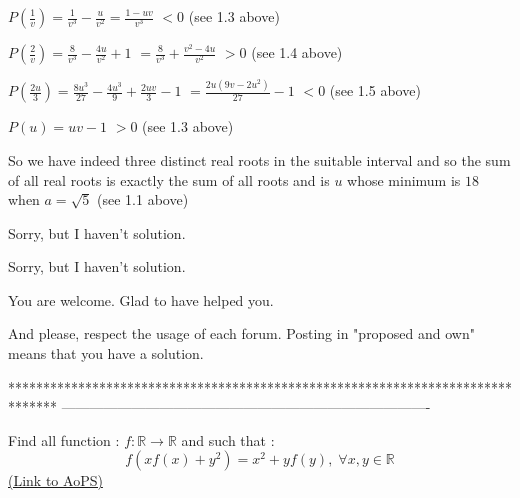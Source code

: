 \begin{solution}
$P(\frac 1v)=\frac 1{v^3}-\frac u{v^2}=\frac{1-uv}{v^3}$ $<0$ (see 1.3 above)

$P(\frac 2v)=\frac 8{v^3}-\frac{4u}{v^2}+1$ $=\frac 8{v^3}+\frac {v^2-4u}{v^2}$ $>0$ (see 1.4 above)

$P(\frac{2u}3)=\frac{8u^3}{27}-\frac{4u^3}9+\frac{2uv}3-1$ $=\frac{2u(9v-2u^2)}{27}-1$ $<0$ (see 1.5 above)

$P(u)=uv-1$ $>0$ (see 1.3 above)

So we have indeed three distinct real roots in the suitable interval and so the sum of all real roots is exactly the sum of all roots and  is $u$ whose minimum is $18$ when $\boxed{a=\sqrt 5}$ (see 1.1 above)
\end{solution}



\begin{solution}
	Sorry, but I haven't solution.
\end{solution}



\begin{solution}
	\begin{tcolorbox}Sorry, but I haven't solution.\end{tcolorbox}
You are welcome.
Glad to have helped you.

And please, respect the usage of each forum. Posting in "proposed and own" means that you have a solution.
\end{solution}
*******************************************************************************
-------------------------------------------------------------------------------

\begin{problem}
	Find all function : $f:\mathbb{R}\rightarrow \mathbb{R}$ and such that :
\[f(xf(x)+y^2)=x^2+yf(y),\;\forall x,y\in \mathbb{R}\]
	\flushright \href{https://artofproblemsolving.com/community/c6h618752}{(Link to AoPS)}
\end{problem}



